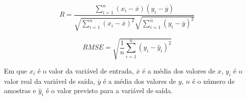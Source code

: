 \begin{equation} \label{eq:r}
	R = \frac{\sum_{i=1}^n (x_i - \overline{x})(y_i - \overline{y})}{\sqrt{\sum_{i=1}^n(x_i - \overline{x})^2} \sqrt{\sum_{i=1}^n (y_i - \overline{y})^2}}
\end{equation}

\begin{equation} \label{eq:rmse}
	RMSE = \sqrt{\frac{1}{n} \sum_{i=1}^n (y_i - \hat{y}_i)^2}
\end{equation}

Em que $x_i$ é o valor da variável de entrada, $\overline{x}$ é a média dos valores de $x$, $y_i$ é o valor real da variável de saída, $\overline{y}$ é a média dos valores de $y$, $n$ é o número de amostras e $\hat{y}_i$ é o valor previsto para a variável de saída.










